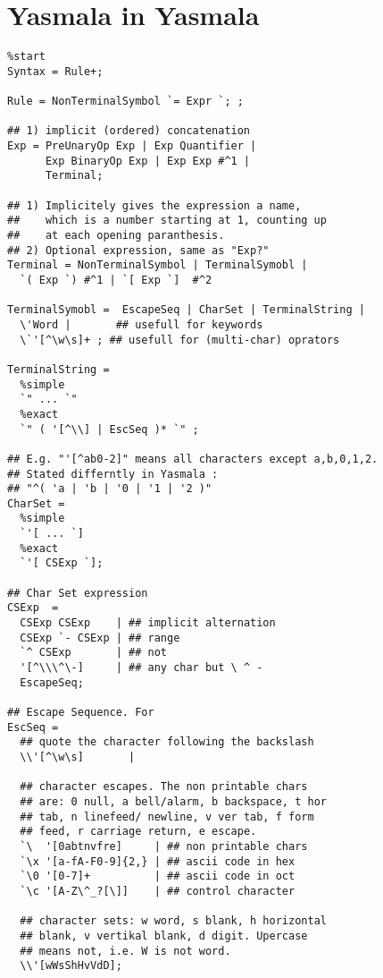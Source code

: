 \documentclass[a4paper]{report}
\begin{document}
\chapter{Yasmala in Yasmala}

\begin{verbatim}
%start
Syntax = Rule+;

Rule = NonTerminalSymbol `= Expr `; ; 

## 1) implicit (ordered) concatenation
Exp = PreUnaryOp Exp | Exp Quantifier |
      Exp BinaryOp Exp | Exp Exp #^1 |
      Terminal;

## 1) Implicitely gives the expression a name,
##    which is a number starting at 1, counting up
##    at each opening paranthesis.
## 2) Optional expression, same as "Exp?"
Terminal = NonTerminalSymbol | TerminalSymobl |
  `( Exp `) #^1 | `[ Exp `]  #^2
  
TerminalSymobl =  EscapeSeq | CharSet | TerminalString |
  \'Word |       ## usefull for keywords
  \`'[^\w\s]+ ; ## usefull for (multi-char) oprators
  
TerminalString =
  %simple
  `" ... `"
  %exact
  `" ( '[^\\] | EscSeq )* `" ;
  
## E.g. "'[^ab0-2]" means all characters except a,b,0,1,2.
## Stated differntly in Yasmala :
## "^( 'a | 'b | '0 | '1 | '2 )"
CharSet =
  %simple
  `'[ ... `] 
  %exact
  `'[ CSExp `];
  
## Char Set expression
CSExp  =
  CSExp CSExp    | ## implicit alternation
  CSExp `- CSExp | ## range
  `^ CSExp       | ## not
  '[^\\\^\-]     | ## any char but \ ^ -
  EscapeSeq;
  
## Escape Sequence. For 
EscSeq =
  ## quote the character following the backslash
  \\'[^\w\s]       |
  
  ## character escapes. The non printable chars
  ## are: 0 null, a bell/alarm, b backspace, t hor
  ## tab, n linefeed/ newline, v ver tab, f form
  ## feed, r carriage return, e escape.
  `\  '[0abtnvfre]     | ## non printable chars
  `\x '[a-fA-F0-9]{2,} | ## ascii code in hex
  `\0 '[0-7]+          | ## ascii code in oct
  `\c '[A-Z\^_?[\]]    | ## control character
  
  ## character sets: w word, s blank, h horizontal
  ## blank, v vertikal blank, d digit. Upercase
  ## means not, i.e. W is not word.
  \\'[wWsShHvVdD];
       

\end{verbatim}
\end{document}
